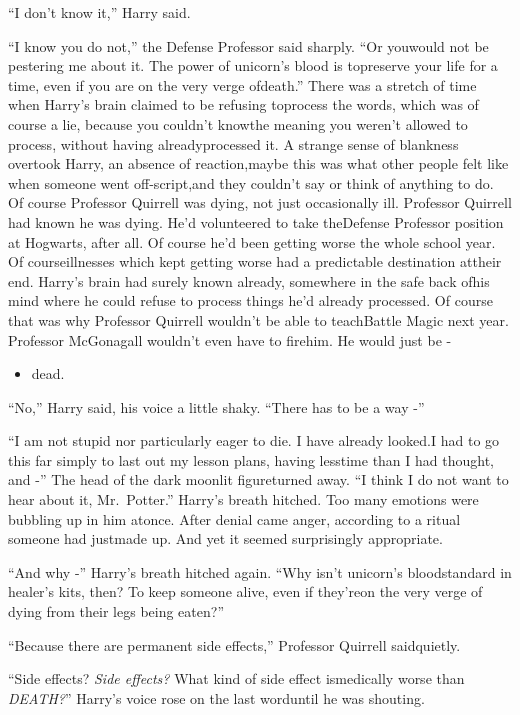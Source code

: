 ``I don't know it,'' Harry said.

``I know you do not,'' the Defense Professor said sharply. ``Or youwould not be pestering me about it. The power of unicorn's blood is topreserve your life for a time, even if you are on the very verge ofdeath.''
There was a stretch of time when Harry's brain claimed to be refusing toprocess the words, which was of course a lie, because you couldn't knowthe meaning you weren't allowed to process, without having alreadyprocessed it.
A strange sense of blankness overtook Harry, an absence of reaction,maybe this was what other people felt like when someone went off-script,and they couldn't say or think of anything to do.
Of course Professor Quirrell was dying, not just occasionally ill.
Professor Quirrell had known he was dying. He'd volunteered to take theDefense Professor position at Hogwarts, after all.
Of course he'd been getting worse the whole school year. Of courseillnesses which kept getting worse had a predictable destination attheir end.
Harry's brain had surely known already, somewhere in the safe back ofhis mind where he could refuse to process things he'd already processed.
Of course that was why Professor Quirrell wouldn't be able to teachBattle Magic next year. Professor McGonagall wouldn't even have to firehim. He would just be -

\begin{itemize}
\itemsep1pt\parskip0pt
\item
  dead.
\end{itemize}

``No,'' Harry said, his voice a little shaky. ``There has to be a way
-''

``I am not stupid nor particularly eager to die. I have already looked.I had to go this far simply to last out my lesson plans, having lesstime than I had thought, and -'' The head of the dark moonlit figureturned away. ``I think I do not want to hear about it, Mr.~Potter.''
Harry's breath hitched. Too many emotions were bubbling up in him atonce. After denial came anger, according to a ritual someone had justmade up. And yet it seemed surprisingly appropriate.

``And why -'' Harry's breath hitched again. ``Why isn't unicorn's bloodstandard in healer's kits, then? To keep someone alive, even if they'reon the very verge of dying from their legs being eaten?''

``Because there are permanent side effects,'' Professor Quirrell saidquietly.

``Side effects? \emph{Side effects?} What kind of side effect ismedically worse than \emph{DEATH?}'' Harry's voice rose on the last worduntil he was shouting.

